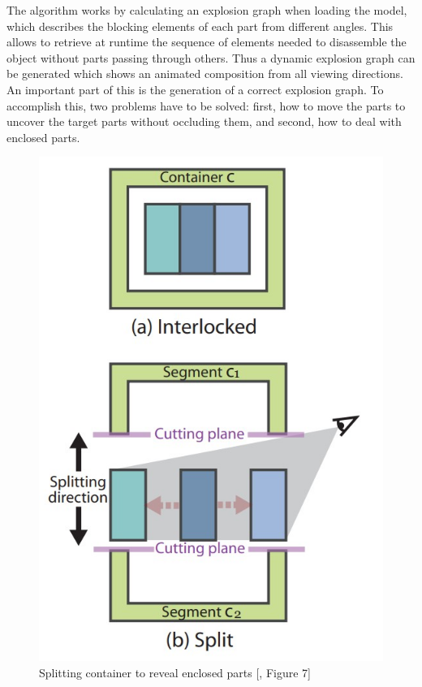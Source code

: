 The algorithm works by calculating an explosion graph when loading the model, which describes the blocking elements of each part from different angles. 
This allows to retrieve at runtime the sequence of elements needed to disassemble the object without parts passing through others. 
Thus a dynamic explosion graph can be generated which shows an animated composition from all viewing directions.
An important part of this is the generation of a correct explosion graph. 
To accomplish this, two problems have to be solved: first, how to move the parts to uncover the target parts without occluding them, and second, how to deal with enclosed parts. 
\begin{figure}
	\centering
	\vspace{-0.4cm}
	\includegraphics[width=1\linewidth]{fig/Images/AutomatedGenerationofInteractive3DExplodedViewDiagrams_Li2008_fig7}
	\caption[]{Splitting container to reveal enclosed parts [\cite{Wilmot_Li_2008}, Figure 7]}
	\label{fig:splittingContainer}
	\vspace{-0.8cm}
\end{figure}
